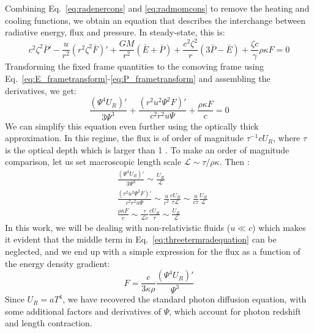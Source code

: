 \documentclass[../main.tex]{subfiles}
\begin{document}
Combining Eq.~\eqref{eq:radenercons} and \eqref{eq:radmomcons} to remove the heating and cooling functions, we obtain an equation that describes the interchange between radiative energy, flux and pressure. In steady-state, this is:
\begin{equation}
    c^2\zeta^2\bar{P}'-\frac{u}{r^2}(r^2\zeta^2\bar{F})'
    +\frac{GM}{r^2}(\bar{E}+\bar{P})+\frac{c^2\zeta^2}{r}(3\bar{P}-\bar{E})+\frac{\zeta c}{\gamma}\rho\kappa F=0
\end{equation}
Transforming the fixed frame quantities to the comoving frame using Eq.~\eqref{eq:E_frametransform}-\eqref{eq:P_frametransform} and assembling the derivatives, we get:
\begin{equation}\label{eq:threetermradequation}
    \frac{(\Psi^4U_R)'}{3\Psi^3}+\frac{(r^2u^2\Psi^2F)'}{c^2r^2u\Psi}+\frac{\rho\kappa F}{c}=0
\end{equation}
We can simplify this equation even further using the optically thick approximation. In this regime, the flux is of order of magnitude $\tau^{-1}cU_R$, where $\tau$ is the optical depth which is larger than 1 \citep{Thorne1981}. To make an order of magnitude comparison, let us set macroscopic length scale $\mathscr{L}\sim \tau/\rho\kappa$.  Then :
\begin{align}
    &\frac{(\Psi^4U_R)'}{3\Psi^3} \sim \frac{U_R}{\mathscr{L}}\\
    &\frac{(r^2u^2\Psi^2F)'}{c^2r^2u\Psi} \sim \frac{u}{c^2}\frac{cU_R}{\tau\mathscr{L}}\sim\frac{u}{c\tau}\frac{U_R}{\mathscr{L}}\\
    &\frac{\rho\kappa F}{c}\sim\frac{\tau}{\mathscr{L}c}\frac{cU_R}{\tau}\sim\frac{U_R}{\mathscr{L}}
\end{align}
In this work, we will be dealing with non-relativistic fluids ($u\ll c$) which makes it evident that the middle term in Eq.~\eqref{eq:threetermradequation} can be neglected, and we end up with a simple expression for the flux as a function of the energy density gradient:
\begin{equation}\label{eq:photondiffusion}
    \boxed{F=\frac{c}{3\kappa\rho}\frac{(\Psi^4U_R)'}{\Psi^3}}
\end{equation}
Since $U_R=aT^4$, we have recovered the standard photon diffusion equation, with some additional factors and derivatives of $\Psi$, which account for photon redshift and length contraction.\\
\end{document}
